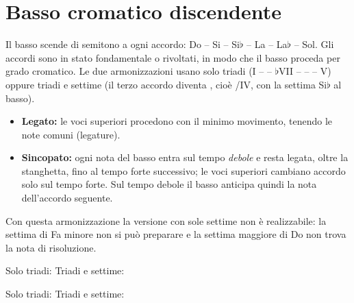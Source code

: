 \section{Basso cromatico discendente}
\label{sec:basso_cromatico_disc}

Il basso scende di semitono a ogni accordo: Do -- Si -- Si$\flat$ -- La -- La$\flat$ -- Sol. Gli accordi sono in stato fondamentale o rivoltati, in modo che il basso proceda per grado cromatico. Le due armonizzazioni usano solo triadi (I --  -- $\flat$VII --  --  -- V) oppure triadi e settime (il terzo accordo diventa , cioè /IV, con la settima Si$\flat$ al basso).

\begin{regola}
	\label{reg:cromatico_legato_sincopato}
	\begin{itemize}
		\item \textbf{Legato:} le voci superiori procedono con il minimo movimento, tenendo le note comuni (legature).
		\item \textbf{Sincopato:} ogni nota del basso entra sul tempo \emph{debole} e resta legata, oltre la stanghetta, fino al tempo forte successivo; le voci superiori cambiano accordo solo sul tempo forte. Sul tempo debole il basso anticipa quindi la nota dell'accordo seguente.
	\end{itemize}
	Con questa armonizzazione la versione con sole settime non è realizzabile: la settima di Fa minore non si può preparare e la settima maggiore di Do non trova la nota di risoluzione.
\end{regola}

\begin{esempio}
	\label{ex:cromatico_legato}
	Solo triadi:
	Triadi e settime:
\end{esempio}

\begin{esempio}
	\label{ex:cromatico_sincopato}
	Solo triadi:
	Triadi e settime:
\end{esempio}
